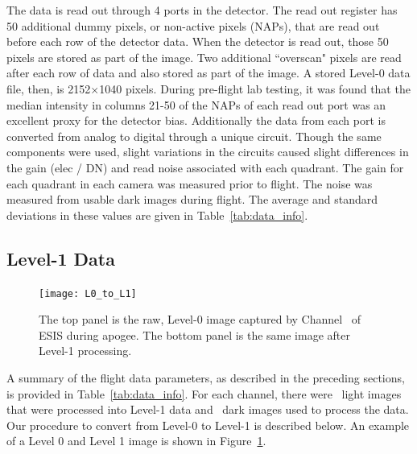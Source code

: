 	    The data is read out through 4 ports in the detector.  The read out register has 50 additional dummy pixels, or non-active pixels (NAPs), that are read out before each row of the detector data.  When the detector is read out, those 50 pixels are stored as part of the image.  Two additional ``overscan" pixels are read after each row of data and also stored as part of the image.  A stored Level-0 data file, then, is 2152$\times$1040 pixels.   During pre-flight lab testing, it was found that the median intensity in columns 21-50 of the NAPs of each read out port was an excellent proxy for the detector bias.  Additionally the data from each port is converted from analog to digital through a unique circuit.  Though the same components were used, slight variations in the circuits caused slight differences in the gain (elec / DN) and read  noise associated with each quadrant.  The gain for each quadrant in each camera was measured prior to flight.  The noise was measured from usable dark images during flight.  The average and standard deviations in these values are given in Table~\ref{tab:data_info}.
    
    \subsection{Level-1 Data}
	    \begin{figure}
	    	\centering
	    	\texttt{[image: L0\_to\_L1]}
	    	\caption{The top panel is the raw, Level-0 image captured by Channel \ of ESIS during apogee. The bottom panel is the same image after Level-1 processing. }
	    	\label{fig:L0_to_L1}
	    \end{figure}
    	
    	A summary of the flight data parameters, as described in the preceding sections, is provided in Table~\ref{tab:data_info}. 
    	For each channel, there were \numDataFrames\ light images that were processed into Level-1 data and \numDarkFrames\ dark images used to process the data.
    	Our procedure to convert from Level-0 to Level-1 is described below. An example of a Level 0 and Level 1 image is shown in Figure~\ref{fig:L0_to_L1}.
    	

